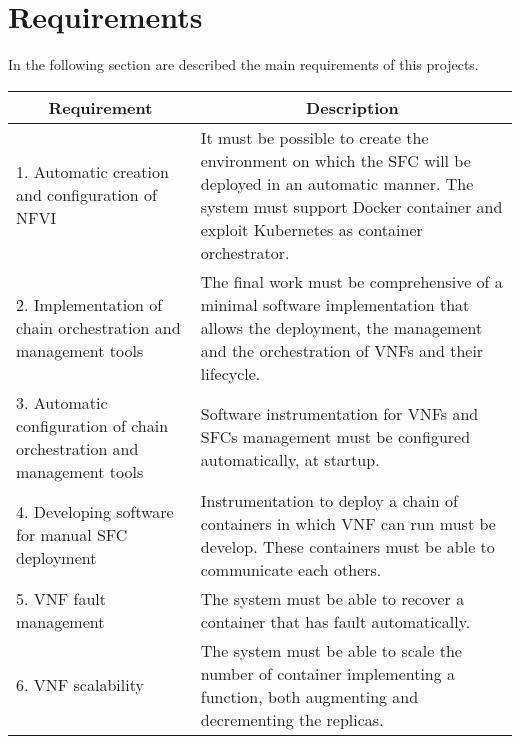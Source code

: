 \section{Requirements}\label{chap:prjan:sec:req}
In the following section are described the main requirements of this projects.

\begin{longtable}[c]{p{}p{}}
\hline
\multicolumn{1}{c}{\textbf{Requirement}}                                & \multicolumn{1}{c}{\textbf{Description}}                                                                                                                                                       \\ \hline
\endhead
%
\hline
\endfoot
%
\endlastfoot
%
1. Automatic creation and configuration of NFVI                         & It must be possible to create the environment on which the SFC will be deployed in an automatic manner. The system must support Docker container and exploit Kubernetes as container orchestrator. \\
2. Implementation of chain orchestration and management tools           & The final work must be comprehensive of a minimal software implementation that allows the deployment, the management and the orchestration of VNFs and their lifecycle.                      \\
3. Automatic configuration of chain orchestration and management tools & Software instrumentation for VNFs and SFCs management must be configured automatically, at startup.                                                                                              \\
4. Developing software for manual SFC deployment                        & Instrumentation to deploy a chain of containers in which VNF can run must be develop. These containers must be able to communicate each others.                                                \\
5. VNF fault management                                                 & The system must be able to recover a container that has fault automatically.                                                                                                                      \\
6. VNF scalability                                                      & The system must be able to scale the number of container implementing a function, both augmenting and decrementing the replicas.                                                               \\

\end{longtable}
